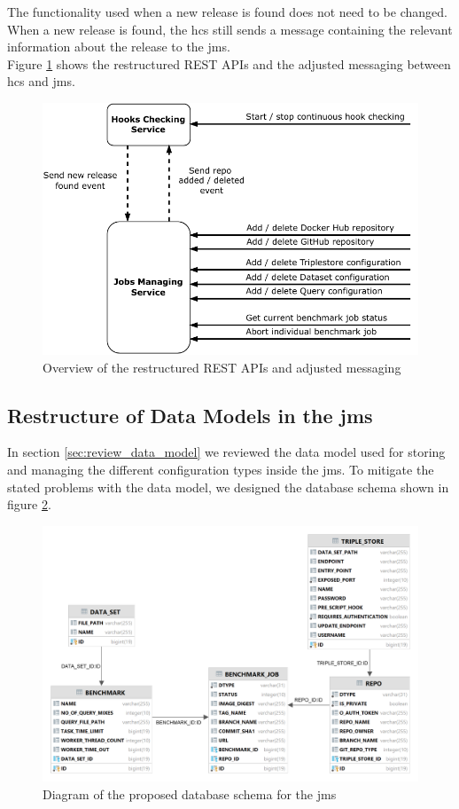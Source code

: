 The functionality used when a new release is found does not need to be changed.
When a new release is found, the \ac{hcs} still sends a message containing the relevant information about the release to the \ac{jms}.
\\

Figure \ref{fig:repo_management_restructure} shows the restructured REST APIs and the adjusted messaging between \ac{hcs} and \ac{jms}.

\begin{figure}[tbph]
	\centering
	\includegraphics[width=.65\textwidth]{figures/messaging-implementation-hcs-jms.pdf}
	\caption{Overview of the restructured REST APIs and adjusted messaging}
	\label{fig:repo_management_restructure}
\end{figure}



\subsection{Restructure of Data Models in the \acl{jms}}
\label{sec:data_model_restructure_jms}
In section \ref{sec:review_data_model} we reviewed the data model used for storing and managing the different configuration types inside the \ac{jms}.
To mitigate the stated problems with the data model, we designed the database schema shown in figure \ref{fig:design_jms_db_schema}.

\begin{figure}[tbph]
	\centering
	\includegraphics[width=.75\textwidth]{figures/jms_db_schema_design.png}
	\caption{Diagram of the proposed database schema for the \ac{jms}}
	\label{fig:design_jms_db_schema}
\end{figure}


